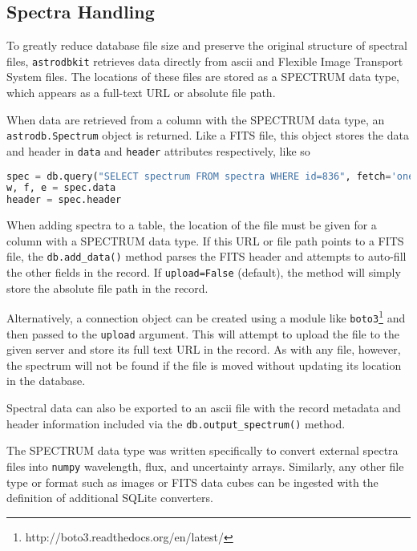 \documentclass[iop,revtex4,natbib209]{emulateapj}
\begin{document}
\subsection{Spectra Handling}{\label{sec:spectra}}

To greatly reduce database file size and preserve the original structure of spectral files, \texttt{astrodbkit} retrieves data directly from ascii and Flexible Image Transport System \citep[FITS;][]{Hani01} files. The locations of these files are stored as a SPECTRUM data type, which appears as a full-text URL or absolute file path. 

When data are retrieved from a column with the SPECTRUM data type, an \texttt{astrodb.Spectrum} object is returned. Like a FITS file, this object stores the data and header in \texttt{data} and \texttt{header} attributes respectively, like so 

\begin{lstlisting}[language=Python]
spec = db.query("SELECT spectrum FROM spectra WHERE id=836", fetch='one')
w, f, e = spec.data
header = spec.header
\end{lstlisting}

When adding spectra to a table, the location of the file must be given for a column with a SPECTRUM data type. If this URL or file path points to a FITS file, the \texttt{db.add\_data()} method parses the FITS header and attempts to auto-fill the other fields in the record. If \texttt{upload=False} (default), the method will simply store the absolute file path in the record. 

Alternatively, a connection object can be created using a module like \texttt{boto3}\footnote{http://boto3.readthedocs.org/en/latest/} and then passed to the \texttt{upload} argument.  This will attempt to upload the file to the given server and store its full text URL in the record. As with any file, however, the spectrum will not be found if the file is moved without updating its location in the database.

Spectral data can also be exported to an ascii file with the record metadata and header information included via the \texttt{db.output\_spectrum()} method.

The SPECTRUM data type was written specifically to convert external spectra files into \texttt{numpy} wavelength, flux, and uncertainty arrays. Similarly, any other file type or format such as images or FITS data cubes can be ingested with the definition of additional SQLite converters.
\end{document}
